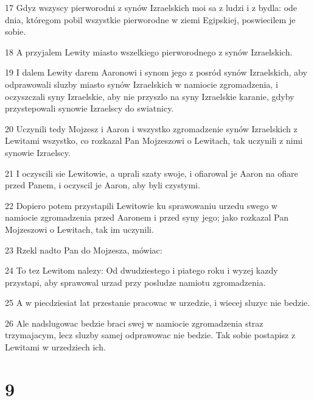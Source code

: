 \par 17 Gdyz wszyscy pierworodni z synów Izraelskich moi sa z ludzi i z bydla: ode dnia, któregom pobil wszystkie pierworodne w ziemi Egipskiej, poswiecilem je sobie.
\par 18 A przyjalem Lewity miasto wszelkiego pierworodnego z synów Izraelskich.
\par 19 I dalem Lewity darem Aaronowi i synom jego z posród synów Izraelskich, aby odprawowali sluzby miasto synów Izraelskich w namiocie zgromadzenia, i oczyszczali syny Izraelskie, aby nie przyszlo na syny Izraelskie karanie, gdyby przystepowali synowie Izraelscy do swiatnicy.
\par 20 Uczynili tedy Mojzesz i Aaron i wszystko zgromadzenie synów Izraelskich z Lewitami wszystko, co rozkazal Pan Mojzeszowi o Lewitach, tak uczynili z nimi synowie Izraelscy.
\par 21 I oczyscili sie Lewitowie, a uprali szaty swoje, i ofiarowal je Aaron na ofiare przed Panem, i oczyscil je Aaron, aby byli czystymi.
\par 22 Dopiero potem przystapili Lewitowie ku sprawowaniu urzedu swego w namiocie zgromadzenia przed Aaronem i przed syny jego; jako rozkazal Pan Mojzeszowi o Lewitach, tak im uczynili.
\par 23 Rzekl nadto Pan do Mojzesza, mówiac:
\par 24 To tez Lewitom nalezy: Od dwudziestego i piatego roku i wyzej kazdy przystapi, aby sprawowal urzad przy posludze namiotu zgromadzenia.
\par 25 A w piecdziesiat lat przestanie pracowac w urzedzie, i wiecej sluzyc nie bedzie.
\par 26 Ale nadslugowac bedzie braci swej w namiocie zgromadzenia straz trzymajacym, lecz sluzby samej odprawowac nie bedzie. Tak sobie postapisz z Lewitami w urzedziech ich.

\chapter{9}

